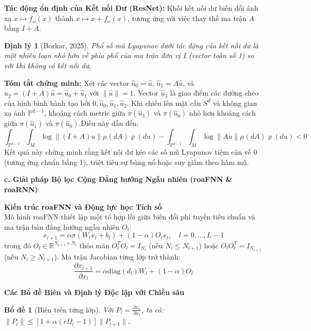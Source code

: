 \documentclass[12pt]{article}
\newtheorem{theorem}{Định lý}
\newtheorem{lemma}{Bổ đề}
\begin{document}
\textbf{Tác động ổn định của Kết nối Dư (ResNet):}
Khối kết nối dư biến đổi ánh xạ $x \mapsto f_\omega(x)$ thành $x \mapsto x + f_\omega(x)$, tương ứng với việc thay thế ma trận $A$ bằng $I + A$.

\begin{theorem}[Borkar, 2025]
Phổ số mũ Lyapunov dưới tác động của kết nối dư là một nhiễu loạn nhỏ hơn về phía phổ của ma trận đơn vị $I$ (vector toàn số 1) so với khi không có kết nối dư.
\end{theorem}
\textbf{Tóm tắt chứng minh:}
Xét các vector $\hat{u}_0 = \hat{u}$, $\hat{u}_1 = A \hat{u}$, và $\hat{u}_2 = (I + A)\hat{u} = \hat{u}_0 + \hat{u}_1$ với $\|\hat{u}\| = 1$. Vector $\hat{u}_3$ là giao điểm các đường chéo của hình bình hành tạo bởi $0, \hat{u}_0, \hat{u}_1, \hat{u}_2$. Khi chiếu lên mặt cầu $S^d$ và không gian xạ ảnh $\mathbb{P}^{d-1}$, khoảng cách metric giữa $\pi(\hat{u}_3)$ và $\pi(\hat{u}_0)$ nhỏ hơn khoảng cách giữa $\pi(\hat{u}_1)$ và $\pi(\hat{u}_0)$.Điều này dẫn đến:
\begin{equation}
\int_{\mathbb{P}^{d-1}} \int_{M} \log \|(I+A)u\| \mu(dA) \varrho(du) - \int_{\mathbb{P}^{d-1}} \int_{M} \log \|Au\| \mu(dA) \varrho(du) < 0
\end{equation}
Kết quả này chứng minh rằng kết nối dư kéo các số mũ Lyapunov tiệm cận về 0 (tương ứng chuẩn bằng 1), triệt tiêu sự bùng nổ hoặc suy giảm theo hàm mũ.


\textbf{c. Giải pháp Bộ lọc Cộng Đẳng hướng Ngẫu nhiên (roaFNN \& roaRNN)}

\textbf{Kiến trúc roaFNN và Động lực học Tích số}\\
Mô hình roaFNN thiết lập một tổ hợp lồi giữa biến đổi phi tuyến tiêu chuẩn và ma trận bán đẳng hướng ngẫu nhiên $O_l$:
\begin{equation}
x_{l+1} = \alpha \sigma(W_l x_l + b_l) + (1-\alpha) O_l x_l, \quad l = 0, \dots, L-1
\end{equation}
trong đó $O_l \in \mathbb{R}^{N_{l+1} \times N_l}$ thỏa mãn $O_l^T O_l = I_{N_l}$ (nếu $N_l \le N_{l+1}$) hoặc $O_l O_l^T = I_{N_{l+1}}$ (nếu $N_l \ge N_{l+1}$). Ma trận Jacobian từng lớp trở thành:
\begin{equation}
\frac{\partial x_{l+1}}{\partial x_l} = \alpha \text{diag}(d_l) W_l + (1-\alpha) O_l
\end{equation}

\textbf{ Các Bổ đề Biên và Định lý Độc lập với Chiều sâu}

\begin{lemma}[Biên trên từng lớp]
Với $P_l = \frac{\partial x_L}{\partial x_l}$, ta có: $\|P_l\| \le \left[ 1 + \alpha (r \Omega_l - 1) \right] \|P_{l+1}\|$.
\end{lemma}
\end{document}
